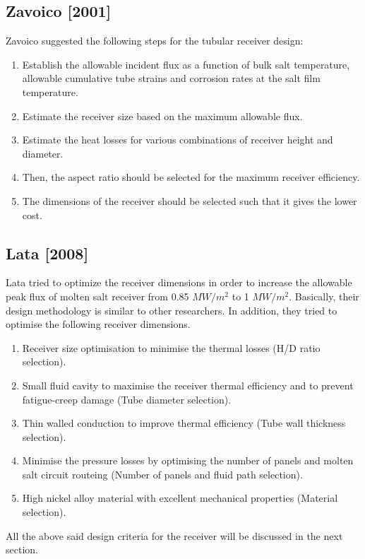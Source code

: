 \subsection{Zavoico [2001] \cite{Zavoico.2001}}
Zavoico \cite{Zavoico.2001} suggested the following steps for the tubular receiver design: 
\begin{enumerate}
	\item Establish the allowable incident flux as a function of bulk salt temperature, allowable cumulative tube strains and corrosion rates at the salt film temperature.
	\item Estimate the receiver size based on the maximum allowable flux.
	\item Estimate the heat losses for various combinations of receiver height and diameter. 
	\item Then, the aspect ratio should be selected for the maximum receiver efficiency.
	\item The dimensions of the receiver should be selected such that it gives the lower cost.
\end{enumerate}
\subsection{Lata [2008] \cite{Lata.2008}}
Lata \cite{Lata.2008} tried to optimize the receiver dimensions in order to increase the allowable peak flux of molten salt receiver from 0.85 $MW/m^2$ to 1 $MW/m^2$. Basically, their design methodology is similar to other researchers. In addition, they tried to optimise the following receiver dimensions.
\begin{enumerate}
	\item Receiver size optimisation to minimise the thermal losses (H/D ratio selection).
	\item Small fluid cavity to maximise the receiver thermal efficiency and to prevent fatigue-creep damage (Tube diameter selection).
	\item Thin walled conduction to improve thermal efficiency (Tube wall thickness selection).
	\item Minimise the pressure losses by optimising the number of panels and molten salt circuit routeing (Number of panels and fluid path selection).
	\item High nickel alloy material with excellent mechanical properties (Material selection).
\end{enumerate}
All the above said design criteria for the receiver will be discussed in the next section.

